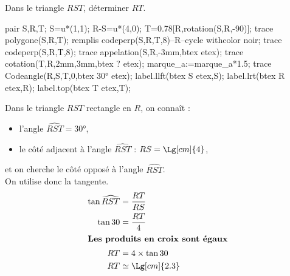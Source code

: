 \begin{methode*1}
    \exercice
    Dans le triangle $RST$, déterminer $RT$.\\
    \begin{Geometrie}[CoinHD={(6u,4.5u)}]        
        pair S,R,T;
        S=u*(1,1);
        R-S=u*(4,0);
        T=0.78[R,rotation(S,R,-90)];
        trace polygone(S,R,T);
        remplis codeperp(S,R,T,8)--R--cycle withcolor noir;
        trace codeperp(S,R,T,8);
        trace appelation(S,R,-3mm,btex  etex);  
        trace cotation(T,R,2mm,3mm,btex ? etex);
        marque_a:=marque_a*1.5;
        trace Codeangle(R,S,T,0,btex \ang{30} etex);
        label.llft(btex S etex,S);
        label.lrt(btex R etex,R);
        label.top(btex T etex,T);
    \end{Geometrie}
    \correction
    Dans le triangle $RST$ rectangle en $R$, on connaît :
    \begin{itemize}        
        \item l'angle $\widehat{RST}=\ang{30}$,        
        \item le côté adjacent à l'angle $\widehat{RST}$ : $RS=\Lg[cm]{4}$,
    \end{itemize}
    et on cherche le côté opposé à l'angle $\widehat{RST}$.\\
    On utilise donc la tangente.
    \begin{align*}
        \tan\widehat{RST}&=\frac{RT}{RS}\\
        \tan30&=\frac{RT}{4}\\
        \intertext{\centering\bf Les produits en croix sont égaux}
        RT&=4\times\tan30\\
        RT&\simeq \Lg[cm]{2.3}
    \end{align*}
\end{methode*1}

